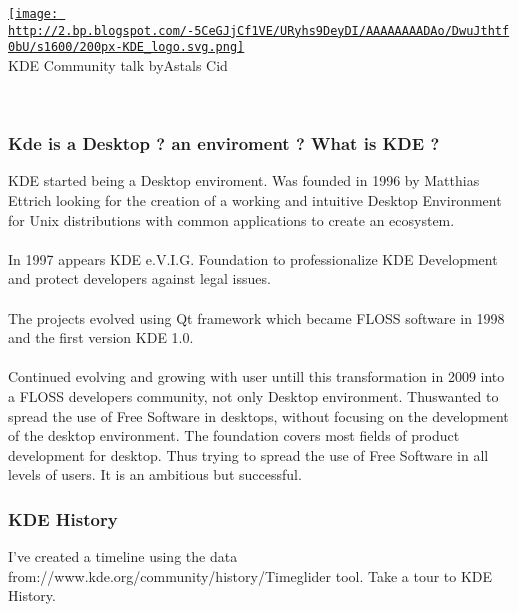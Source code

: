 
\begin{tabular}\href{http://2.bp.blogspot.com/-5CeGJjCf1VE/URyhs9DeyDI/AAAAAAAADAo/DwuJthtf0bU/s1600/200px-KDE_logo.svg.png}{
\texttt{[image: http://2.bp.blogspot.com/-5CeGJjCf1VE/URyhs9DeyDI/AAAAAAAADAo/DwuJthtf0bU/s1600/200px-KDE\_logo.svg.png]}} \\ 
KDE Community talk by\nolinebreakAlbert Astals Cid
\end{tabular}
\\

\subsubsection{ Kde is a Desktop ? an enviroment \nolinebreak? What is KDE ?} KDE started being a Desktop enviroment. Was founded in 1996 by Matthias Ettrich looking for the creation of a working and intuitive Desktop Environment for Unix distributions with common applications to create an ecosystem.
\\
\\ In 1997 appears KDE e.V.I.G. Foundation to professionalize KDE Development and protect developers against legal issues.
\\
\\ The projects evolved using Qt framework which became FLOSS software in 1998 and the first version KDE 1.0.
\\
\\ Continued evolving and growing with user untill this transformation in 2009 into a FLOSS developers community, not only Desktop environment. Thus\nolinebreakKDE wanted to spread the use of Free Software in desktops, without focusing on the development of the desktop environment. The foundation covers most fields of product development for desktop. Thus trying to spread the use of Free Software in all levels of users. It is an ambitious but successful.
\\

\subsubsection{ KDE History} I've created a timeline using the data from\nolinebreakhttp://www.kde.org/community/history/\nolinebreakand Timeglider tool. Take a tour to KDE History.
\\
\\
\\

